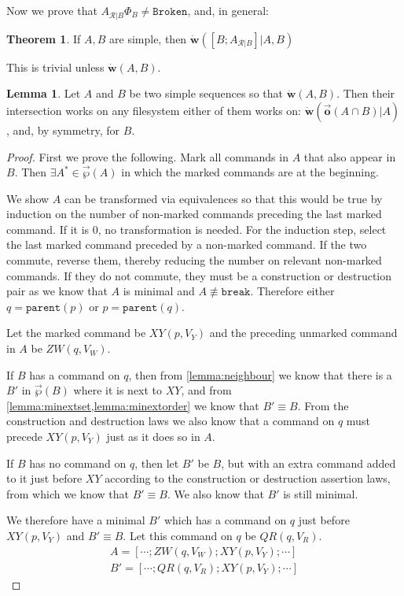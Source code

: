 \documentclass[12pt]{article}
\newcommand{\parent}{\mathtt{parent}}
\newcommand{\fsbroken}{\mathtt{Broken}} %
\newcommand{\FS}{\Phi} %
\newcommand{\cbrk}{\mathtt{break}}
\newcommand{\fscommand}[2]{{#1#2}}
\newcommand{\cxy}{\fscommand{X}{Y}}
\newcommand{\czw}{\fscommand{Z}{W}}
\newcommand{\cqr}{\fscommand{Q}{R}}
\newcommand{\nequiv}{\not\equiv}
\newcommand{\works}[1]{\dot{\mathbf{w}}({#1})}
\newcommand{\worksc}[2]{\dot{\mathbf{w}}({#1}|{#2})}
\newcommand{\orderset}[1]{\vec{\wp}({#1})}
\newcommand{\ordered}[1]{\vec{\mathbf{o}}({#1})}
\newcommand{\recchar}[3]{{#1}^{#3}_{\mathcal{R}|{#2}}}
\newcommand{\reca}{\recchar{A}{B}{}} %
\theoremstyle{definition}
\newtheorem{mylem}{Lemma}
\newtheorem{myth}{Theorem}
\begin{document}
Now we prove that $\reca\FS_B\neq\fsbroken$, and, in general:

\begin{myth}
If $A, B$ are simple, then $\worksc{[B;\reca]}{A,B}$
\end{myth}

This is trivial unless $\works{A,B}$.

\begin{mylem}
Let $A$ and $B$ be two simple sequences so that $\works{A, B}$.
Then their intersection works on any filesystem
either of them works on:
$\worksc{\ordered{A\cap B}}{A}$, and, by symmetry, for $B$.
\end{mylem}

\begin{proof}
First we prove the following.
Mark all commands in $A$ that also appear in $B$.
Then $\exists A^* \in \orderset{A}$ in which the marked commands are at the beginning.

\medskip

We show $A$ can be transformed via equivalences so that this would be true
by induction on the number of non-marked commands preceding the last marked command.
If it is 0, no transformation is needed.
For the induction step, select the last marked command preceded by a non-marked command.
If the two commute, reverse them, thereby reducing the number on relevant non-marked commands.
If they do not commute, they must be a construction or destruction pair as we know
that $A$ is minimal and $A\nequiv\cbrk$.
Therefore either $q=\parent(p)$ or $p=\parent(q)$.

Let the marked command be $\cxy(p, V_Y)$ and the preceding unmarked command in $A$ be $\czw(q, V_W)$.

If $B$ has a command on $q$, then
from \cref{lemma:neighbour}
we know that there is a $B'$ in $\orderset{B}$ where it is next to $\cxy$,
and from \cref{lemma:minextset,lemma:minextorder} we know that $B'\equiv B$.
From the construction and destruction laws we also know that a command on $q$
must precede $\cxy(p, V_Y)$ just as it does so in $A$.

If $B$ has no command on $q$, then let $B'$ be $B$, but with an extra command added to it just before $\cxy$
according to the construction or destruction assertion laws, from which we know
that $B'\equiv B$.
We also know that $B'$ is still minimal.

We therefore have a minimal $B'$ which has a command on $q$ just before $\cxy(p, V_Y)$ and $B'\equiv B$.
Let this command on $q$ be $\cqr(q, V_R)$.
\begin{gather*}
A = [\cdots; \czw(q, V_W); \cxy(p, V_Y); \cdots] \\
B' = [\cdots; \cqr(q, V_R); \cxy(p, V_Y); \cdots]
\end{gather*}


\end{proof}
\end{document}
